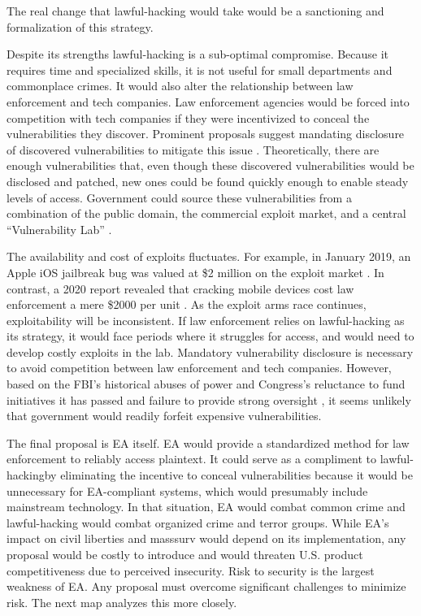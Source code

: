 The real change that \ac{lawful-hacking} would take would be a sanctioning and formalization of this strategy.

Despite its strengths \ac{lawful-hacking} is a sub-optimal compromise. Because it requires time and specialized skills,
it is not useful for small departments and commonplace crimes. It would also alter the relationship between law
enforcement and tech companies. Law enforcement agencies would be forced into competition with tech companies if they
were incentivized to conceal the vulnerabilities they discover. Prominent proposals suggest mandating disclosure of
discovered vulnerabilities to mitigate this issue \cite{bellovin_lawful_2013} \cite{hennessey_lawful_2016}.
Theoretically, there are enough vulnerabilities that, even though these discovered vulnerabilities would be disclosed and
patched, new ones could be found quickly enough to enable steady levels of access. Government could source these
vulnerabilities from a combination of the public domain, the commercial exploit market, and a central ``Vulnerability
Lab'' \cite{bellovin_lawful_2013}.

The availability and cost of exploits fluctuates. For example, in January 2019, an Apple iOS jailbreak bug was valued at
\$2 million on the exploit market \cite{goodin_zeroday_2019}. In contrast, a 2020 report revealed that cracking mobile
devices cost law enforcement a mere \$2000 per unit \cite{koepke_2020}. As the exploit arms race continues,
exploitability will be inconsistent. If law enforcement relies on \ac{lawful-hacking} as its strategy, it would face
periods where it struggles for access, and would need to develop costly exploits in the lab. Mandatory vulnerability
disclosure is necessary to avoid competition between law enforcement and tech companies. However, based on the
\ac{FBI}'s historical abuses of power \cite{shamsi_2011} and Congress's reluctance to fund initiatives it has passed
\cite{keller_internet_2019} and failure to provide strong oversight \cite{johnson_congressional_2004}, it seems unlikely
that government would readily forfeit expensive vulnerabilities.

The final proposal is \ac{EA} itself. \ac{EA} would provide a standardized method for law enforcement to reliably access
\ac{plaintext}. It could serve as a compliment to \ac{lawful-hacking}by eliminating the incentive to conceal
vulnerabilities because it would be unnecessary for \ac{EA}-compliant systems, which would presumably include mainstream
technology. In that situation, \ac{EA} would combat common crime and \ac{lawful-hacking} would combat organized crime
and terror groups. While \ac{EA}'s impact on civil liberties and \ac{masssurv} would depend on its implementation, any
proposal would be costly to introduce and would threaten U.S. product competitiveness due to perceived insecurity. Risk
to security is the largest weakness of \ac{EA}. Any proposal must overcome significant challenges to minimize risk. The
next map analyzes this more closely.


